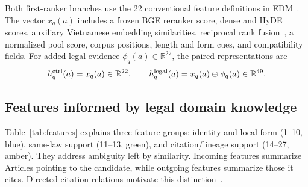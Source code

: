 \documentclass[runningheads,a4paper]{llncs}
\begin{document}
Both first-ranker branches use the 22 conventional feature definitions in EDM~\cite{pham2025edm}. The vector $x_q(a)$ includes a frozen BGE reranker score, dense and HyDE scores, auxiliary Vietnamese embedding similarities, reciprocal rank fusion~\cite{cormack2009rrf}, a normalized pool score, corpus positions, length and form cues, and compatibility fields. For added legal evidence $\phi_q(a)\in\mathbb R^{27}$, the paired representations are
\begin{equation}
 h_q^{\rm ctrl}(a)=x_q(a)\in\mathbb R^{22},\qquad
 h_q^{\rm legal}(a)=x_q(a)\oplus\phi_q(a)\in\mathbb R^{49}.
 \label{eq:features}
\end{equation}

\subsection{Features informed by legal domain knowledge}
Table~\ref{tab:features} explains three feature groups: identity and local form (1--10, blue), same-law support (11--13, green), and citation/lineage support (14--27, amber). They address ambiguity left by similarity. Incoming features summarize Articles pointing to the candidate, while outgoing features summarize those it cites. Directed citation relations motivate this distinction~\cite{colombo2025legissearch}.
\end{document}
